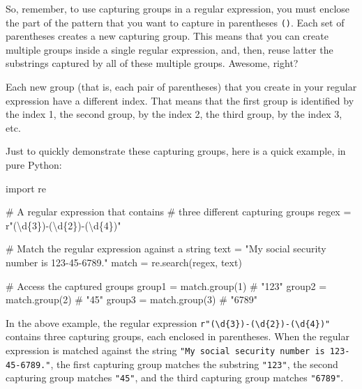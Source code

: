 \documentclass[
  11pt,
  letterpaper,
  DIV=11,
  numbers=noendperiod]{scrreprt}
\newenvironment{Shaded}{\begin{snugshade}}{\end{snugshade}}
\newcommand{\CommentTok}[1]{\textcolor[rgb]{0.37,0.37,0.37}{#1}}
\newcommand{\DecValTok}[1]{\textcolor[rgb]{0.68,0.00,0.00}{#1}}
\newcommand{\ImportTok}[1]{\textcolor[rgb]{0.00,0.46,0.62}{#1}}
\newcommand{\NormalTok}[1]{\textcolor[rgb]{0.00,0.23,0.31}{#1}}
\newcommand{\OperatorTok}[1]{\textcolor[rgb]{0.37,0.37,0.37}{#1}}
\newcommand{\SpecialCharTok}[1]{\textcolor[rgb]{0.37,0.37,0.37}{#1}}
\newcommand{\StringTok}[1]{\textcolor[rgb]{0.13,0.47,0.30}{#1}}
\newcommand{\VerbatimStringTok}[1]{\textcolor[rgb]{0.13,0.47,0.30}{#1}}
\begin{document}
So, remember, to use capturing groups in a regular expression, you must
enclose the part of the pattern that you want to capture in parentheses
\texttt{()}. Each set of parentheses creates a new capturing group. This
means that you can create multiple groups inside a single regular
expression, and, then, reuse latter the substrings captured by all of
these multiple groups. Awesome, right?

Each new group (that is, each pair of parentheses) that you create in
your regular expression have a different index. That means that the
first group is identified by the index 1, the second group, by the index
2, the third group, by the index 3, etc.

Just to quickly demonstrate these capturing groups, here is a quick
example, in pure Python:

\begin{Shaded}
\begin{Highlighting}[]
\ImportTok{import}\NormalTok{ re}

\CommentTok{\# A regular expression that contains}
\CommentTok{\# three different capturing groups}
\NormalTok{regex }\OperatorTok{=} \VerbatimStringTok{r"(\textbackslash{}d}\SpecialCharTok{\{3\}}\VerbatimStringTok{){-}(\textbackslash{}d}\SpecialCharTok{\{2\}}\VerbatimStringTok{){-}(\textbackslash{}d}\SpecialCharTok{\{4\}}\VerbatimStringTok{)"}

\CommentTok{\# Match the regular expression against a string}
\NormalTok{text }\OperatorTok{=} \StringTok{"My social security number is 123{-}45{-}6789."}
\NormalTok{match }\OperatorTok{=}\NormalTok{ re.search(regex, text)}

\CommentTok{\# Access the captured groups}
\NormalTok{group1 }\OperatorTok{=}\NormalTok{ match.group(}\DecValTok{1}\NormalTok{)  }\CommentTok{\# "123"}
\NormalTok{group2 }\OperatorTok{=}\NormalTok{ match.group(}\DecValTok{2}\NormalTok{)  }\CommentTok{\# "45"}
\NormalTok{group3 }\OperatorTok{=}\NormalTok{ match.group(}\DecValTok{3}\NormalTok{)  }\CommentTok{\# "6789"}
\end{Highlighting}
\end{Shaded}

In the above example, the regular expression
\texttt{r"(\textbackslash{}d\{3\})-(\textbackslash{}d\{2\})-(\textbackslash{}d\{4\})"}
contains three capturing groups, each enclosed in parentheses. When the
regular expression is matched against the string
\texttt{"My\ social\ security\ number\ is\ 123-45-6789."}, the first
capturing group matches the substring \texttt{"123"}, the second
capturing group matches \texttt{"45"}, and the third capturing group
matches \texttt{"6789"}.
\end{document}
